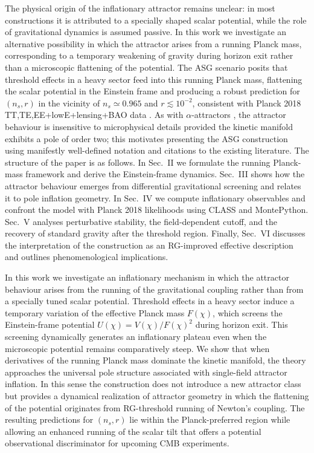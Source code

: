 \documentclass[
]{article}
\begin{document}
The physical origin of the inflationary attractor remains unclear: in
most constructions it is attributed to a specially shaped scalar
potential, while the role of gravitational dynamics is assumed passive.
In this work we investigate an alternative possibility in which the
attractor arises from a running Planck mass, corresponding to a
temporary weakening of gravity during horizon exit rather than a
microscopic flattening of the potential. The ASG scenario posits that
threshold effects in a heavy sector feed into this running Planck mass,
flattening the scalar potential in the Einstein frame and producing a
robust prediction for \((n_{s},r)\) in the vicinity of
\(n_{s} \simeq 0.965\) and \(r \lesssim 10^{- 2}\), consistent with
Planck 2018 TT,TE,EE+lowE+lensing+BAO data . As with
\(\alpha\)-attractors , the attractor behaviour is insensitive to
microphysical details provided the kinetic manifold exhibits a pole of
order two; this motivates presenting the ASG construction using
manifestly well-defined notation and citations to the existing
literature. The structure of the paper is as follows. In Sec.~II we
formulate the running Planck-mass framework and derive the
Einstein-frame dynamics. Sec.~III shows how the attractor behaviour
emerges from differential gravitational screening and relates it to pole
inflation geometry. In Sec.~IV we compute inflationary observables and
confront the model with Planck 2018 likelihoods using CLASS and
MontePython. Sec.~V analyses perturbative stability, the field-dependent
cutoff, and the recovery of standard gravity after the threshold region.
Finally, Sec.~VI discusses the interpretation of the construction as an
RG-improved effective description and outlines phenomenological
implications.

In this work we investigate an inflationary mechanism in which the
attractor behaviour arises from the running of the gravitational
coupling rather than from a specially tuned scalar potential. Threshold
effects in a heavy sector induce a temporary variation of the effective
Planck mass \(F(\chi)\), which screens the Einstein-frame potential
\(U(\chi) = V(\chi)/F(\chi)^{2}\) during horizon exit. This screening
dynamically generates an inflationary plateau even when the microscopic
potential remains comparatively steep. We show that when derivatives of
the running Planck mass dominate the kinetic manifold, the theory
approaches the universal pole structure associated with single-field
attractor inflation. In this sense the construction does not introduce a
new attractor class but provides a dynamical realization of attractor
geometry in which the flattening of the potential originates from
RG-threshold running of Newton's coupling. The resulting predictions for
\((n_{s},r)\) lie within the Planck-preferred region while allowing an
enhanced running of the scalar tilt that offers a potential
observational discriminator for upcoming CMB experiments.
\end{document}

